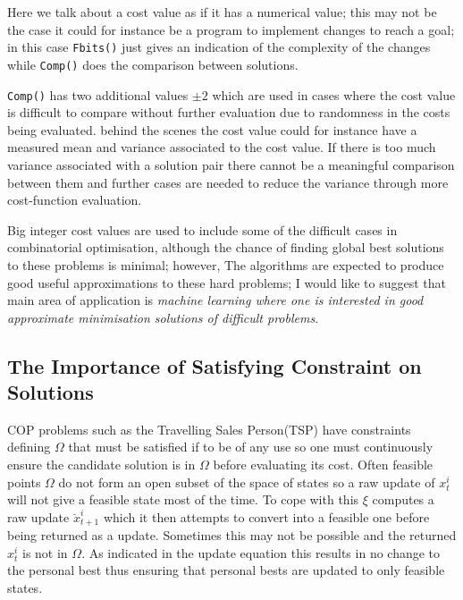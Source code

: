 \documentclass[a4paper,oneside,english]{article}
\numberwithin{equation}{section}
\numberwithin{figure}{section}
\begin{document}
Here we talk about a cost value as if it has a numerical value; this may not be  the case it could for instance be a program to implement changes to reach a goal; in this case  \texttt{Fbits()} just gives an indication of the complexity of the changes while \texttt{Comp()} does the comparison between solutions. 

\texttt{Comp()} has two additional values $\pm2$ which are used in cases where the cost value is difficult to compare without further evaluation due to randomness in the costs being evaluated. behind the scenes the cost value could for instance have a measured mean and variance associated to the cost value. If there is too much variance associated with a solution pair there cannot be a meaningful comparison between them and further cases are needed to reduce the variance through more cost-function evaluation.  

Big integer cost values are used to include some of the difficult cases in combinatorial optimisation, although the chance of finding global best solutions to these problems is minimal; however, The algorithms are expected to produce good useful approximations to these hard problems; I would like to suggest that main area of application is \emph{machine learning where one is interested in good approximate minimisation solutions of difficult problems}.


\subsection{The Importance of Satisfying Constraint on Solutions }
COP problems such as the Travelling Sales Person(TSP) have constraints defining $\varOmega$ that must be satisfied if to be of any use so one must continuously ensure the candidate solution is in $\varOmega$ before evaluating its cost. Often feasible points $\varOmega$ do not form an open subset of the space of states so a raw update of $x_t^i$ will not give a feasible state most of the time. To cope with this $\xi$ computes a raw update $\breve{x}_{t+1}^i$ which it then attempts to  convert into a feasible one before being returned as a update. Sometimes this may not be possible and the returned $x_t^i$ is not in $\varOmega$. As indicated in the update equation this results in no change to the personal best thus ensuring that personal bests are updated to only feasible states.   
\end{document}
